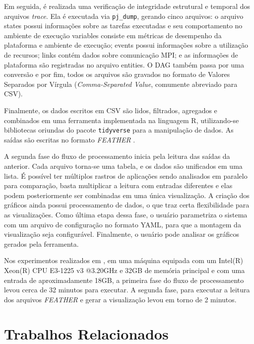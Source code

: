 Em seguida, é realizada uma verificação de integridade estrutural e temporal dos
arquivos \emph{trace}. Ela é executada via \texttt{pj\_dump}, gerando cinco 
arquivos: o arquivo states possui informações sobre as tarefas executadas e seu comportamento no 
ambiente de execução variables consiste em métricas de desempenho da 
plataforma e ambiente de execução; events 
possui informações sobre a utilização de recursos; links contém dados sobre comunicação MPI; e as 
informações de plataforma são registradas no arquivo entities. O DAG também passa por uma conversão e por 
fim, todos os arquivos são gravados no formato de Valores 
Separados por Vírgula (\emph{Comma-Separated Value}, comumente abreviado para 
CSV).

Finalmente, os dados escritos em CSV são lidos, filtrados, agregados e 
combinados em uma ferramenta implementada na linguagem R, utilizando-se bibliotecas oriundas 
do pacote \texttt{tidyverse} para a manipulação de dados. As saídas são escritas no 
formato \emph{FEATHER} \cite{ref:feather}.

A segunda fase do fluxo de processamento inicia pela leitura das saídas da 
anterior. 
Cada arquivo torna-se uma tabela, e os dados são unificados em uma 
lista. É possível ter múltiplos rastros de aplicações sendo 
analisados em 
paralelo para comparação, basta multiplicar a leitura com entradas diferentes e 
elas podem posteriormente ser combinadas em uma única visualização. A criação 
dos gráficos ainda possui processamento de dados, o que traz certa flexibilidade para as 
visualizações. Como última etapa dessa fase, o usuário parametriza o sistema com um arquivo de configuração no formato YAML, para que 
a montagem da visualização seja configurável. Finalmente, o usuário pode 
analisar 
os gráficos gerados pela ferramenta.

Nos experimentos realizados em \citet{ref:starvz}, em uma máquina equipada com 
um Intel(R) Xeon(R) CPU E3-1225 v3 @3.20GHz e 32GB de memória principal e com 
uma entrada de aproximadamente 18GB, a primeira fase do fluxo de processamento 
levou cerca de 32 minutos para executar. A segunda fase, para executar a leitura 
dos arquivos \emph{FEATHER} e gerar a visualização levou em torno de 2 minutos.

\section{Trabalhos Relacionados}\label{sect:related-work}

